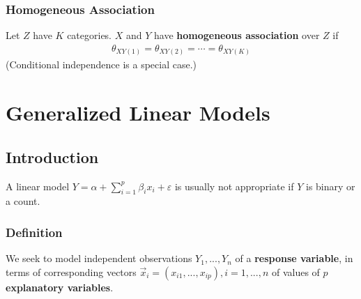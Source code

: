 \documentclass[11pt]{elegantbook}
\begin{document}
\subsection{Homogeneous Association}
\begin{definition}
    Let $Z$ have $K$ categories. $X$ and $Y$ have \textbf{homogeneous association} over $Z$ if
    \begin{equation}
        \begin{aligned}
            \theta_{XY(1)}=\theta_{XY(2)}=\cdots=\theta_{XY(K)}
        \end{aligned}
        \nonumber
    \end{equation}
    (Conditional independence is a special case.)
\end{definition}

\chapter{Generalized Linear Models}
\section{Introduction}
A linear model $Y=\alpha+\sum_{i=1}^p \beta_i x_i +\varepsilon$ is usually not appropriate if $Y$ is binary or a count.

\subsection{Definition}
We seek to model independent observations $Y_1,...,Y_n$ of a \textbf{response variable}, in terms of corresponding vectors $\vec{x}_i=(x_{i1},...,x_{ip}),i=1,...,n$ of values of $p$ \textbf{explanatory variables}.
\end{document}

